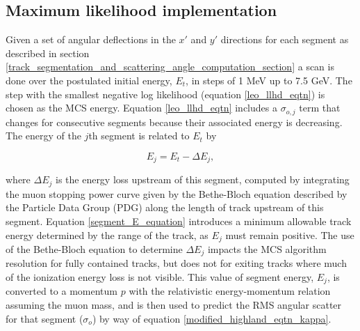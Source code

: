 \documentclass[a4paper,11pt]{article}
\begin{document}
\subsection{Maximum likelihood implementation}\label{maximum_likelihood_section}

Given a set of angular deflections in the $x'$ and $y'$ directions for each segment as described in section \ref{track_segmentation_and_scattering_angle_computation_section} a scan is done over the postulated initial energy, $E_t$, in steps of 1 MeV up to 7.5 GeV. The step with the smallest negative log likelihood (equation \ref{leo_llhd_eqtn}) is chosen as the MCS energy. Equation \ref{leo_llhd_eqtn} includes a $\sigma_{o,j}$ term that changes for consecutive segments because their associated energy is decreasing. The energy of the $j$th segment is related to $E_t$ by

\begin{equation}\label{segment_E_equation}
E_{j} = E_t - \Delta E_{j},
\end{equation}

\noindent where $\Delta E_{j}$ is the energy loss upstream of this segment, computed by integrating the muon stopping power curve given by the Bethe-Bloch equation described by the Particle Data Group (PDG) \cite{stoppingpowersource} along the length of track upstream of this segment. Equation \ref{segment_E_equation} introduces a minimum allowable track energy determined by the range of the track, as $E_{j}$ must remain positive. The use of the Bethe-Bloch equation to determine $\Delta E_{j}$ impacts the MCS algorithm resolution for fully contained tracks, but does not for exiting tracks where much of the ionization energy loss is not visible. This value of segment energy, $E_{j}$, is converted to a momentum $p$ with the relativistic energy-momentum relation assuming the muon mass, and is then used to predict the RMS angular scatter for that segment ($\sigma_o$) by way of equation \ref{modified_highland_eqtn_kappa}. 
\end{document}
